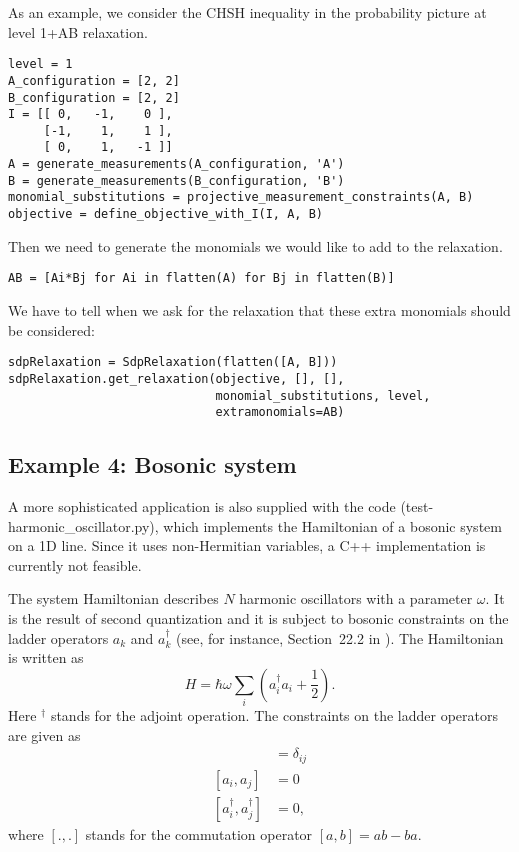 \documentclass{article}
\begin{document}
As an example, we consider the CHSH inequality in the probability picture at level 1+AB relaxation.
\begin{verbatim}
level = 1
A_configuration = [2, 2]
B_configuration = [2, 2]
I = [[ 0,   -1,    0 ],
     [-1,    1,    1 ], 
     [ 0,    1,   -1 ]]
A = generate_measurements(A_configuration, 'A')
B = generate_measurements(B_configuration, 'B')
monomial_substitutions = projective_measurement_constraints(A, B)
objective = define_objective_with_I(I, A, B)
\end{verbatim}
Then we need to generate the monomials we would like to add to the relaxation.
\begin{verbatim}
AB = [Ai*Bj for Ai in flatten(A) for Bj in flatten(B)]  
\end{verbatim}
We have to tell when we ask for the relaxation that these extra monomials should be considered:
\begin{verbatim}
sdpRelaxation = SdpRelaxation(flatten([A, B]))
sdpRelaxation.get_relaxation(objective, [], [],
                             monomial_substitutions, level,
                             extramonomials=AB)
\end{verbatim}

\subsection{Example 4: Bosonic system}
A more sophisticated application is  also supplied with the code (test-harmonic\_oscillator.py), which implements the Hamiltonian of a bosonic system on a 1D line. Since it uses non-Hermitian variables, a C++ implementation is currently not feasible.

The system Hamiltonian describes $N$ harmonic oscillators with a parameter $\omega$. It is the result of second quantization and it is subject to bosonic constraints on the ladder operators $a_{k}$ and $a_{k}^{\dagger}$ (see, for instance, Section~22.2 in \cite{fayngold2013quantum}). The Hamiltonian is written as
\begin{equation}
  H = \hbar \omega\sum_{i}\left(a_{i}^{\dagger}a_{i}+\frac{1}{2}\right).
\end{equation}
Here $^{\dagger}$ stands for the adjoint operation. The constraints on the ladder operators are given as
\begin{align}
[a_{i},a_{j}^{\dagger}] &=  \delta_{ij} \\
[a_{i},a_{j}]  &=  0 \nonumber \\
[a_{i}^{\dagger},a_{j}^{\dagger}] &=  0,\nonumber
\end{align}
where $[.,.]$ stands for the commutation operator $[a,b]=ab-ba$. 
\end{document}
